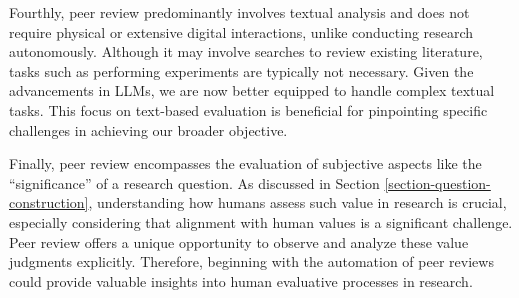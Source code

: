 Fourthly, peer review predominantly involves textual analysis and does not require physical or extensive digital interactions, unlike conducting research autonomously. Although it may involve searches to review existing literature, tasks such as performing experiments are typically not necessary. Given the advancements in LLMs, we are now better equipped to handle complex textual tasks. This focus on text-based evaluation is beneficial for pinpointing specific challenges in achieving our broader objective.

Finally, peer review encompasses the evaluation of subjective aspects like the ``significance'' of a research question. As discussed in Section \ref{section-question-construction}, understanding how humans assess such value in research is crucial, especially considering that alignment with human values is a significant challenge. Peer review offers a unique opportunity to observe and analyze these value judgments explicitly. Therefore, beginning with the automation of peer reviews could provide valuable insights into human evaluative processes in research.





